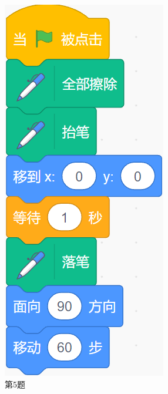 \documentclass[10pt, a4paper]{article}
\begin{document}
\begin{enumerate}
\begin{figure}[htbp]
\begin{minipage}[t]{.09\textwidth}
                \includegraphics[width=\textwidth]{5.png}
                \caption*{第5题}
            \end{minipage}
        \end{figure}


\end{enumerate}
\end{document}
